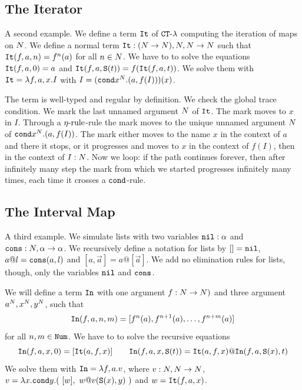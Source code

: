\documentclass{article}
\begin{document}


\subsection{The Iterator}
A second example. We define a term ${\tt It}$ of  ${ {\tt CT}\mbox{-}\lambda}$ computing the iteration of maps on ${N}$.
We define a normal term ${\tt It}:({N} \rightarrow {N}), {N},{N} \rightarrow {N}$ such that
${\tt It}(f,a,n)=f^n(a)$ for all $n \in {N}$. 
We have to to solve the equations ${\tt It}(f,a,0) = a$ and ${\tt It}(f,a,{\tt S} (t)) = f({\tt It}(f,a,t))$.
We solve them with ${\tt It} = \lambda f, a, x.I$
with $I = ({\tt cond} x^{N}. (a, f(I) ))(x)$.

The term is well-typed and regular by definition. We check the global trace condition. 
We mark the last unnamed argument ${N}$ of ${\tt It}$. The mark moves to $x$ in $I$.
 Through a ${\eta\mbox{-rule}}$-rule the mark moves to the unique unnamed argument ${N}$ of  
$ {\tt cond} x^{N}. (a, f(I) )$.
The mark either moves to the name $x$ in the context of $a$ and there it stops, or 
it progresses and moves to $x$ in the context of $f(I)$, then in the context of $I:{N}$.
Now we loop: if the path continues forever, then after infinitely many step the mark from which we started 
progresses infinitely many times, each time it crosses a ${\tt cond}$-rule.



\subsection{The Interval Map}
A third example. We simulate lists with two variables ${\tt nil}:\alpha$ and 
${\tt cons}:{N},\alpha \rightarrow \alpha$. We recursively define a notation for lists by $[]={\tt nil}$,
$a @ l={\tt cons}(a,l)$ and $[a,\vec{a}] = a @ [\vec{a}]$. We add no elimination rules for lists, though,
only the variables ${\tt nil}$ and ${\tt cons}$.

We will define a term ${\tt In}$ with one argument $f:{N} \rightarrow {N})$ and three argument
$a^{N},x^{N},y^{N}$, such that 
$$
{\tt In}(f,a,n,m) = [f^n(a), f^{n+1}(a), \ldots, f^{n+m}(a)]
$$ 
for all $n,m \in {\tt Num}$. 
We have to to solve the recursive equations 
$$
\Interval(f,a,x,0) = [\Iter(a,f,x)]
\ \ \ \ \ \ 
\Interval(f,a,x,\Succ (t)) = \Iter(a,f,x) @ \Interval(f,a,\Succ(x),t)
$$ 
We solve them with ${\tt In} = \lambda f,a.v$,
where $v:{N},{N}\rightarrow {N}$, 
$v = \lambda x.{\tt cond} y. (\ [w],  \  w @ v({\tt S} (x),y) \ )$ and $w={\tt It}(f,a,x)$.
\end{document}
